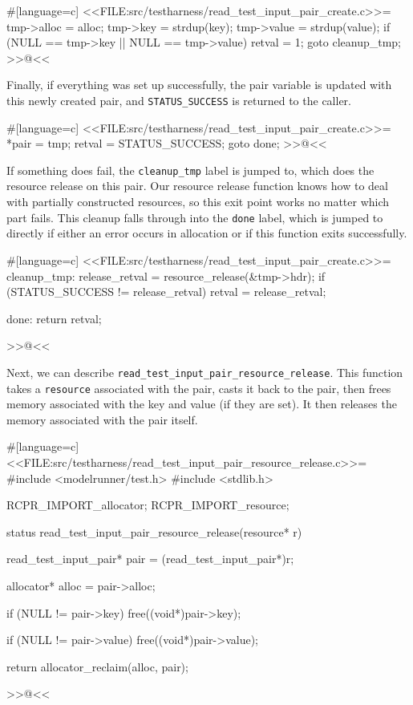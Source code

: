 {{#[language=c]
<<FILE:src/testharness/read_test_input_pair_create.c>>=
    tmp->alloc = alloc;
    tmp->key = strdup(key);
    tmp->value = strdup(value);
    if (NULL == tmp->key || NULL == tmp->value)
    {
        retval = 1;
        goto cleanup_tmp;
    }
>>@<<

Finally, if everything was set up successfully, the pair variable is updated
with this newly created pair, and \verb/STATUS_SUCCESS/ is returned to the
caller.

#[language=c]
<<FILE:src/testharness/read_test_input_pair_create.c>>=
    *pair = tmp;
    retval = STATUS_SUCCESS;
    goto done;
>>@<<

If something does fail, the \verb/cleanup_tmp/ label is jumped to, which does
the resource release on this pair. Our resource release function knows how to
deal with partially constructed resources, so this exit point works no matter
which part fails.  This cleanup falls through into the \verb/done/ label, which
is jumped to directly if either an error occurs in allocation or if this
function exits successfully.

#[language=c]
<<FILE:src/testharness/read_test_input_pair_create.c>>=
cleanup_tmp:
    release_retval = resource_release(&tmp->hdr);
    if (STATUS_SUCCESS != release_retval)
    {
        retval = release_retval;
    }

done:
    return retval;
}
>>@<<

Next, we can describe \verb/read_test_input_pair_resource_release/. This
function takes a \verb/resource/ associated with the pair, casts it back to the
pair, then frees memory associated with the key and value (if they are set). It
then releases the memory associated with the pair itself.

#[language=c]
<<FILE:src/testharness/read_test_input_pair_resource_release.c>>=
#include <modelrunner/test.h>
#include <stdlib.h>

RCPR_IMPORT_allocator;
RCPR_IMPORT_resource;

status read_test_input_pair_resource_release(resource* r)
{
    read_test_input_pair* pair = (read_test_input_pair*)r;

    allocator* alloc = pair->alloc;

    if (NULL != pair->key)
    {
        free((void*)pair->key);
    }

    if (NULL != pair->value)
    {
        free((void*)pair->value);
    }

    return allocator_reclaim(alloc, pair);
}
>>@<<

}

